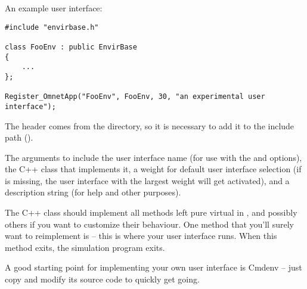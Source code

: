 An example user interface:

\begin{verbatim}
#include "envirbase.h"

class FooEnv : public EnvirBase
{
    ...
};

Register_OmnetApp("FooEnv", FooEnv, 30, "an experimental user interface");
\end{verbatim}

The  header comes from the  directory,
so it is necessary to add it to the include path ().

The arguments to  include the user interface name
(for use with the  and  options),
the C++ class that implements it, a weight for default user interface selection
(if  is missing, the user interface with the largest weight will get
activated), and a description string (for help and other purposes).

The C++ class should implement all methods left pure virtual in
, and possibly others if you want to customize
their behaviour. One method that you'll surely want to reimplement is
 -- this is where your user interface runs. When this method
exits, the simulation program exits.

\begin{note}
A good starting point for implementing your own user interface is
Cmdenv -- just copy and modify its source code to quickly get going.
\end{note}



